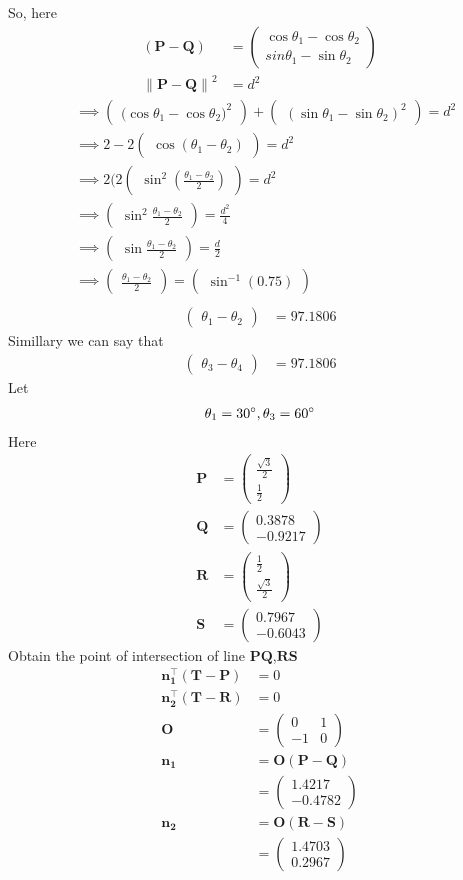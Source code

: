 \documentclass[jornel,10pt,twocolumn]{article}
\providecommand{\norm}[1]{\left\lVert#1\right\rVert}
\newcommand{\myvec}[1]{\ensuremath{\begin{pmatrix}#1\end{pmatrix}}}
\let\vec\mathbf
\begin{document}
So, here
\begin{align}
	(\vec{P}-\vec{Q})&=\myvec{{\cos\theta_1}-{\cos\theta_2}\\{sin\theta_1}-{\sin\theta_2}}\\
	\norm{\vec{P}-\vec{Q}}^2&=d^2
		\end{align}
		\begin{align*}
	&\implies\myvec{({\cos\theta_1}-{\cos\theta_2)}^2}+\myvec{({\sin\theta_1}-{\sin\theta_2})^2}=d^2\\
	&\implies2-2\myvec{\cos(\theta_1-\theta_2)}=d^2\\
	&\implies2(2\myvec{{\sin^2}(\frac{{\theta_1}-{\theta_2}}{2})}=d^2\\
	&\implies\myvec{{\sin^2}\frac{{\theta_1}-{\theta_2}}{2}}=\frac{d^2}{4}\\
	&\implies\myvec{\sin\frac{{\theta_1}-{\theta_2}}{2}}=\frac{d}{2}\\
&\implies\myvec{\frac{{\theta_1}-{\theta_2}}{2}}=\myvec{{\sin^{-1}}(0.75)}\\
	\end{align*}
\begin{align}
	\myvec{{\theta_1}-{\theta_2}}&=97.1806 
	\end{align}
Simillary we can say that
\begin{align}
	\myvec{{\theta_3}-{\theta_4}}&=97.1806   		       
\end{align}	
Let
\begin{align}
{\theta_1=30\degree},{\theta_3=60\degree}
\end{align}
Here
\begin{align}
\vec{P}&=\myvec{\frac{\sqrt{3}}{2}\\[2pt]\frac{1}{2}}\\
\vec{Q}&=\myvec{0.3878\\-0.9217}\\
\vec{R}&=\myvec{\frac{1}{2}\\[2pt]\frac{\sqrt{3}}{2}}\\
\vec{S}&=\myvec{0.7967\\-0.6043}
\end{align}
Obtain the point of intersection of line $\vec{PQ}$,$\vec{RS}$
\begin{align}
\vec{n_1^{\top}}(\vec{T}-\vec{P})&=0\label{15}\\
\vec{n_2^{\top}}(\vec{T}-\vec{R})&=0\label{16}\\
\vec{O}&=\myvec{0&1\\-1&0}\\
\vec{n_1}&=\vec{O}(\vec{P}-\vec{Q})\\
&=\myvec{1.4217\\-0.4782}\\
\vec{n_2}&=\vec{O}(\vec{R}-\vec{S})\\
&=\myvec{1.4703\\0.2967}
\end{align}
\end{document}
